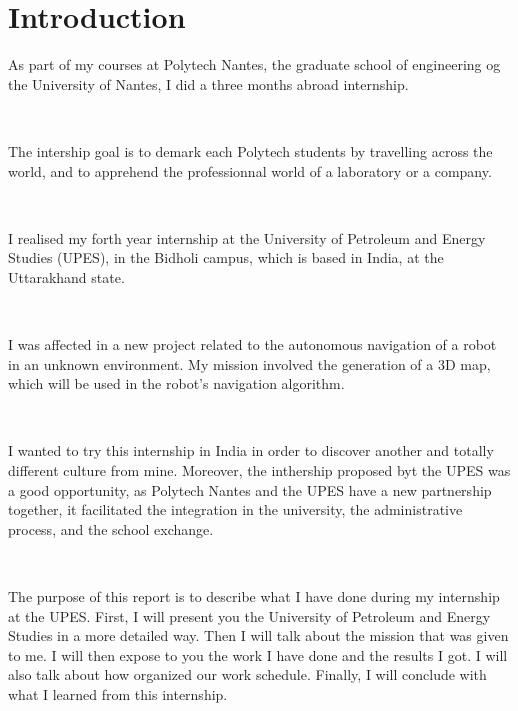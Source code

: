 \chapter{Introduction}

As part of my courses at Polytech Nantes, the graduate school of engineering og the University of Nantes, I did a three months abroad internship. 

~~

The intership goal is to demark each Polytech students by travelling across the world, and to apprehend the professionnal world of a laboratory or a company.

~~

I realised my forth year internship at the University of Petroleum and Energy Studies (UPES), in the Bidholi campus, which is based in India, at the Uttarakhand state.

~~

I was affected in a new project related to the autonomous navigation of a robot in an unknown environment. My mission involved the generation of a 3D map, which will be used in the robot's navigation algorithm.

~~

I wanted to try this internship in India in order to discover another and totally different culture from mine. Moreover, the inthership proposed byt the UPES was a good opportunity, as Polytech Nantes and the UPES have a new partnership together, it facilitated the integration in the university, the administrative process, and the school exchange. 

~~

The purpose of this report is to describe what I have done during my internship at the UPES. First, I will present you the University of Petroleum and Energy Studies in a more detailed way. Then I will talk about the mission that was given to me. I will then expose to you the work I have done and the results I got. I will also talk about how organized our work schedule. Finally, I will conclude with what I learned from this internship.
